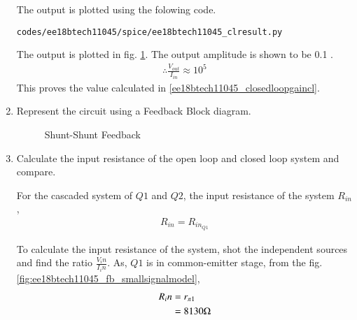 \begin{enumerate}[label=\arabic*.,ref=\theenumi]
The output is plotted using the folowing code.
\begin{lstlisting}
codes/ee18btech11045/spice/ee18btech11045_clresult.py
\end{lstlisting}

The output is plotted in fig. \ref{fig:ee18btech11045_fb_clresult}. The output amplitude is shown to be 0.1 .
\begin{align}
    \therefore \frac{V_{out}}{I_{in}} \approx 10^{5}
\end{align}
This proves the value calculated in \eqref{ee18btech11045_closedloopgaincl}.

\begin{figure}[h!]
	\begin{center}
		\resizebox{\columnwidth/1}{!}{}
	\end{center}
	\caption{}
	\label{fig:ee18btech11045_fb_clresult}
\end{figure}

\item Represent the circuit using a Feedback Block diagram.

\solution

\begin{figure}[!ht]
	\begin{center}
			\resizebox{\columnwidth}{!}{}
	\end{center}
\caption{Shunt-Shunt Feedback}
\label{fig:Block_Diagram}
\end{figure}

\item Calculate the input resistance of the open loop and closed loop system and compare.

\solution

For the cascaded system of $Q1$ and $Q2$, the input resistance of the system $R_{in}$,
\begin{align}
    R_{in} = R_{in_{Q1}}   
\end{align}

To calculate the input resistance of the system, shot the independent sources  and find the ratio $\frac{V_in}{I_in}$. As, $Q1$ is in common-emitter stage, from the fig. \ref{fig:ee18btech11045_fb_smallsignalmodel},
\begin{align}
    R_in &= r_{\pi1}
    \\
    &= 8130 \ohm
\end{align}


\end{enumerate}
